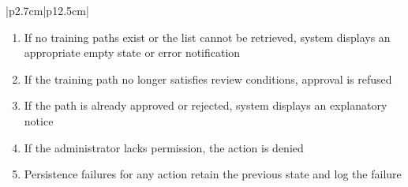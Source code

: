 \begin{table}[H]
\begin{tabular}{|p{2.7cm}|p{12.5cm}|}
\begin{minipage}[t]{\linewidth}
            \begin{enumerate}[topsep=0pt,itemsep=1pt,parsep=0pt,partopsep=0pt]
                \item If no training paths exist or the list cannot be retrieved, system displays an appropriate empty state or error notification
                \item If the training path no longer satisfies review conditions, approval is refused
                \item If the path is already approved or rejected, system displays an explanatory notice
                \item If the administrator lacks permission, the action is denied
                \item Persistence failures for any action retain the previous state and log the failure
            \end{enumerate}
        \end{minipage} \\
        \hline
    \end{tabular}
    \label{tab:admin-review-training-paths}
\end{table}
